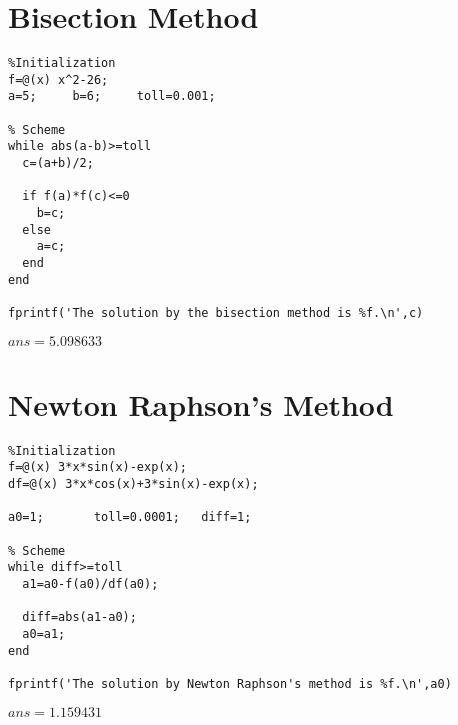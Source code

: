 \section{Bisection Method}

\begin{verbatim}
%Initialization
f=@(x) x^2-26;
a=5;     b=6;     toll=0.001;

% Scheme
while abs(a-b)>=toll
  c=(a+b)/2;

  if f(a)*f(c)<=0
    b=c;
  else
    a=c;
  end
end

fprintf('The solution by the bisection method is %f.\n',c)
\end{verbatim}

\(ans=5.098633\)

\clearpage


\section{Newton Raphson's Method}

\begin{verbatim}
%Initialization
f=@(x) 3*x*sin(x)-exp(x);
df=@(x) 3*x*cos(x)+3*sin(x)-exp(x);

a0=1;       toll=0.0001;   diff=1;

% Scheme
while diff>=toll
  a1=a0-f(a0)/df(a0);

  diff=abs(a1-a0);
  a0=a1;
end

fprintf('The solution by Newton Raphson's method is %f.\n',a0)
\end{verbatim}

\(ans=1.159431\)
